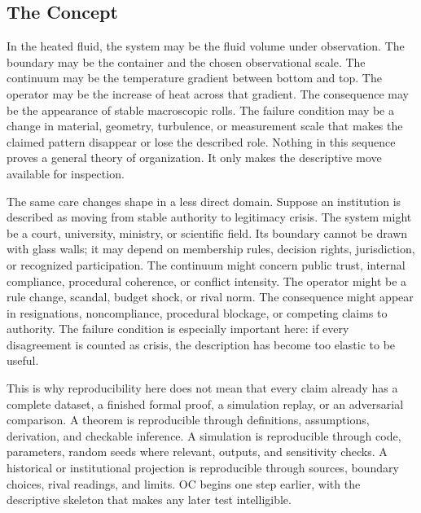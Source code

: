 \documentclass[11pt,a4paper,openany]{book}
\begin{document}
\subsection{The Concept}
In the heated fluid, the system may be the fluid volume under observation. The boundary may be the container and the chosen observational scale. The continuum may be the temperature gradient between bottom and top. The operator may be the increase of heat across that gradient. The consequence may be the appearance of stable macroscopic rolls. The failure condition may be a change in material, geometry, turbulence, or measurement scale that makes the claimed pattern disappear or lose the described role. Nothing in this sequence proves a general theory of organization. It only makes the descriptive move available for inspection. \cite{prigogine_dissipative,haken_synergetics}\par
The same care changes shape in a less direct domain. Suppose an institution is described as moving from stable authority to legitimacy crisis. The system might be a court, university, ministry, or scientific field. Its boundary cannot be drawn with glass walls; it may depend on membership rules, decision rights, jurisdiction, or recognized participation. The continuum might concern public trust, internal compliance, procedural coherence, or conflict intensity. The operator might be a rule change, scandal, budget shock, or rival norm. The consequence might appear in resignations, noncompliance, procedural blockage, or competing claims to authority. The failure condition is especially important here: if every disagreement is counted as crisis, the description has become too elastic to be useful.\par
This is why reproducibility here does not mean that every claim already has a complete dataset, a finished formal proof, a simulation replay, or an adversarial comparison. A theorem is reproducible through definitions, assumptions, derivation, and checkable inference. A simulation is reproducible through code, parameters, random seeds where relevant, outputs, and sensitivity checks. A historical or institutional projection is reproducible through sources, boundary choices, rival readings, and limits. OC begins one step earlier, with the descriptive skeleton that makes any later test intelligible.\par
\end{document}
